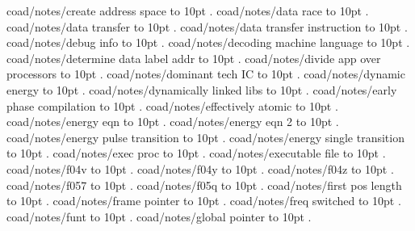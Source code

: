 \smallskip
coad/notes/create address space \leaders\hbox to 10pt {\hss.\hss}  \hfill {}
\smallskip
coad/notes/data race \leaders\hbox to 10pt {\hss.\hss}  \hfill {}
\smallskip
coad/notes/data transfer \leaders\hbox to 10pt {\hss.\hss}  \hfill {}
\smallskip
coad/notes/data transfer instruction \leaders\hbox to 10pt {\hss.\hss}  \hfill {}
\smallskip
coad/notes/debug info \leaders\hbox to 10pt {\hss.\hss}  \hfill {}
\smallskip
coad/notes/decoding machine language \leaders\hbox to 10pt {\hss.\hss}  \hfill {}
\smallskip
coad/notes/determine data label addr \leaders\hbox to 10pt {\hss.\hss}  \hfill {}
\smallskip
coad/notes/divide app over processors \leaders\hbox to 10pt {\hss.\hss}  \hfill {}
\smallskip
coad/notes/dominant tech IC \leaders\hbox to 10pt {\hss.\hss}  \hfill {}
\smallskip
coad/notes/dynamic energy \leaders\hbox to 10pt {\hss.\hss}  \hfill {}
\smallskip
coad/notes/dynamically linked libs \leaders\hbox to 10pt {\hss.\hss}  \hfill {}
\smallskip
coad/notes/early phase compilation \leaders\hbox to 10pt {\hss.\hss}  \hfill {}
\smallskip
coad/notes/effectively atomic \leaders\hbox to 10pt {\hss.\hss}  \hfill {}
\smallskip
coad/notes/energy eqn \leaders\hbox to 10pt {\hss.\hss}  \hfill {}
\smallskip
coad/notes/energy eqn 2 \leaders\hbox to 10pt {\hss.\hss}  \hfill {}
\smallskip
coad/notes/energy pulse transition \leaders\hbox to 10pt {\hss.\hss}  \hfill {}
\smallskip
coad/notes/energy single transition \leaders\hbox to 10pt {\hss.\hss}  \hfill {}
\smallskip
coad/notes/exec proc \leaders\hbox to 10pt {\hss.\hss}  \hfill {}
\smallskip
coad/notes/executable file \leaders\hbox to 10pt {\hss.\hss}  \hfill {}
\smallskip
coad/notes/f04v \leaders\hbox to 10pt {\hss.\hss}  \hfill {}
\smallskip
coad/notes/f04y \leaders\hbox to 10pt {\hss.\hss}  \hfill {}
\smallskip
coad/notes/f04z \leaders\hbox to 10pt {\hss.\hss}  \hfill {}
\smallskip
coad/notes/f057 \leaders\hbox to 10pt {\hss.\hss}  \hfill {}
\smallskip
coad/notes/f05q \leaders\hbox to 10pt {\hss.\hss}  \hfill {}
\smallskip
coad/notes/first pos length \leaders\hbox to 10pt {\hss.\hss}  \hfill {}
\smallskip
coad/notes/frame pointer \leaders\hbox to 10pt {\hss.\hss}  \hfill {}
\smallskip
coad/notes/freq switched \leaders\hbox to 10pt {\hss.\hss}  \hfill {}
\smallskip
coad/notes/funt \leaders\hbox to 10pt {\hss.\hss}  \hfill {}
\smallskip
coad/notes/global pointer \leaders\hbox to 10pt {\hss.\hss}  \hfill {}
